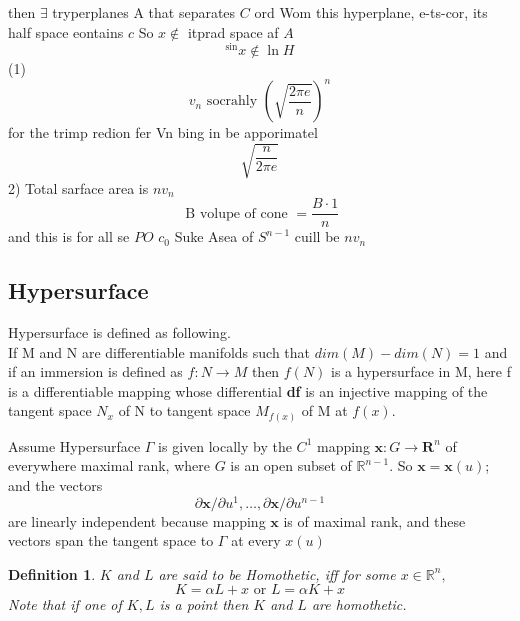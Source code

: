 \documentclass[oneside]{book}
\newtheorem{mydef}{Definition}
\begin{document}
then $\exists$ tryperplanes A that separates $C$ ord
Wom this hyperplane, e-ts-cor, its half space eontains $c$
So $x \notin$ itprad space af $A$
\[
^{\sin } x \notin \ln H
\]
(1)
\[
v_{n} \text { socrahly }(\sqrt{\frac{2 \pi e}{n}})^{n}
\]
for the trimp redion fer Vn bing in be apporimatel
\[
\sqrt{\frac{n}{2 \pi e}}
\]
2) Total sarface area is $n v_{n}$
\[
\text { B volupe of cone }=\frac{B \cdot 1}{n}
\]
and this is for all
se
$P O$
$c_{0}$
Suke Asea of $S^{n-1}$ cuill be $n v_{n}$



































\subsection{Hypersurface}

\label{ss:10}


Hypersurface is defined as following.
\\If M and N are differentiable manifolds such that $dim(M)-dim(N) = 1 $ and if an immersion is defined as $f: N\rightarrow M$ then $f(N)$ is a hypersurface in M, here f is a differentiable mapping whose differential \textbf{df} is an injective mapping of the 
     tangent space $N_{x}$ of N to  tangent space $M_{f(x)}$ of M at $f(x)$.
    

    
    
       Assume  Hypersurface $\Gamma$ is given locally by the $C^{1}$ mapping $\mathbf{x}: G \rightarrow \mathbf{R}^{n}$ of everywhere
maximal rank, where $G$ is an open subset of $\mathbb{R}^{n-1} .$ So $\mathbf{x}=\mathbf{x}(u)$; and the vectors \\
$$
\partial \mathbf{x} / \partial u^{1}, \ldots, \partial \mathbf{x} / \partial u^{n-1} 
$$
are linearly independent because  mapping $\mathbf{x}$ is of maximal rank, and these vectors span the tangent space to $\Gamma$ at every $x(u)$\\
\begin{mydef} \label{d:2}
$K$ and $L$ are said to be Homothetic, iff for some $x  \in \mathbb{R}^n,$ \\
$$K = \alpha L + x \text{ or } L=\alpha K+x $$
Note that if one of $K, L $ is a point then $K $ and $L$ are homothetic.
\end{mydef}
\end{document}
